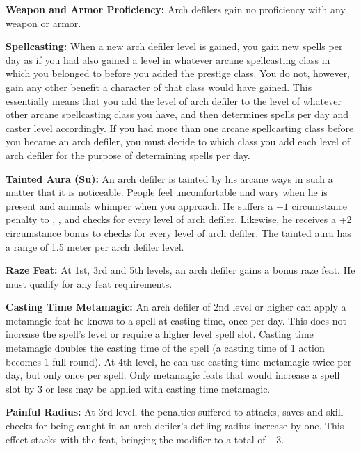 {
\textbf{Weapon and Armor Proficiency:} Arch defilers gain no proficiency with any weapon or armor.

\textbf{Spellcasting:} When a new arch defiler level is gained, you gain new spells per day as if you had also gained a level in whatever arcane spellcasting class in which  you belonged to before you added the prestige class. You do not, however, gain any other benefit a character of that class would have gained. This essentially means that you add the level of arch defiler to the level of whatever other arcane spellcasting class you have, and then determines spells per day and caster level accordingly. If you had more than one arcane spellcasting class before you became an arch defiler, you must decide to which class you add each level of arch defiler for the purpose of determining spells per day.

\textbf{Tainted Aura (Su):} An arch defiler is tainted by his arcane ways in such a matter that it is noticeable. People feel uncomfortable and wary when he is present and animals whimper when you approach. He suffers a $-1$ circumstance penalty to , ,  and  checks for every level of arch defiler. Likewise, he receives a +2 circumstance bonus to  checks for every level of arch defiler. The tainted aura has a range of 1.5 meter per arch defiler level.

\textbf{Raze Feat:} At 1st, 3rd and 5th levels, an arch defiler gains a bonus raze feat. He must qualify for any feat requirements.

\textbf{Casting Time Metamagic:} An arch defiler of 2nd level or higher can apply a metamagic feat he knows to a spell at casting time, once per day. This does not increase the spell's level or require a higher level spell slot. Casting time metamagic doubles the casting time of the spell (a casting time of 1 action becomes 1 full round). At 4th level, he can use casting time metamagic twice per day, but only once per spell. Only metamagic feats that would increase a spell slot by 3 or less may be applied with casting time metamagic.

\textbf{Painful Radius:} At 3rd level, the penalties suffered to attacks, saves and skill checks for being caught in an arch defiler's defiling radius increase by one. This effect stacks with the  feat, bringing the modifier to a total of $-3$.

}
